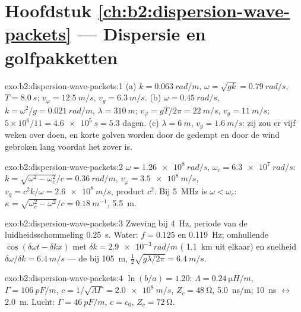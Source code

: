 \section*{Hoofdstuk \ref{ch:b2:dispersion-wave-packets} --- Dispersie en
golfpakketten}

\begin{solution}{exo:b2:dispersion-wave-packets:1}
(a) $k = \qty{0.063}{rad/m}$, $\omega = \sqrt{gk} = \qty{0.79}{rad/s}$,
$T = \qty{8.0}{s}$; $v_\varphi = \qty{12.5}{m/s}$, $v_g = \qty{6.3}{m/s}$.
(b) $\omega = \qty{0.45}{rad/s}$, $k = \omega^2
/g = \qty{0.021}{rad/m}$,
$\lambda = \qty{310}{m}$; $v_\varphi = gT/2\pi = \qty{22}{m/s}$,
$v_g =
\qty{11}{m/s}$; $5 \times 10^6/11 = \qty{4.6e5}{s} = 5.3$ dagen. (c)
$\lambda = \qty{6}{m}$, $v_g
= \qty{1.6}{m/s}$: zij zou er vijf weken over
doen, en korte golven worden door de  gedempt en door de wind
gebroken lang voordat het zover is.
\end{solution}

\begin{solution}{exo:b2:dispersion-wave-packets:2}
$\omega = \qty{1.26e8}{rad/s}$, $\omega_c = \qty{6.3e7}{rad/s}$:
$k = \sqrt{\omega^2 - \omega_c^2}/c =
\qty{0.36}{rad/m}$,
$v_\varphi = \qty{3.5e8}{m/s}$, $v_g = c^2k/\omega = \qty{2.6e8}{m/s}$,
product $c^2$. Bij \qty{5}{MHz} is $\omega < \omega_c$:
$\kappa = \sqrt{\omega_c^2 - \omega^2}/c =
\qty{0.18}{m^{-1}}$,
 \qty{5.5}{m}.
\end{solution}

\begin{solution}{exo:b2:dispersion-wave-packets:3}
Zweving bij \qty{4}{Hz}, periode van de luidheidsschommeling \qty{0.25}{s}.
Water: $f = 0.125$ en \qty{0.119}{Hz}; omhullende
$\cos(\delta\omega t - \delta kx)$ met $\delta k = \qty{2.9e-3}{rad/m}$
( \qty{1.1}{km} uit elkaar) en snelheid
$\delta\omega/\delta k = \qty{6.4}{m/s}$ --- de  bij
\qty{105}{m}, $\tfrac12\sqrt{g\lambda/2\pi} = \qty{6.4}{m/s}$.
\end{solution}

\begin{solution}{exo:b2:dispersion-wave-packets:4}
$\ln(b/a) = 1.20$: $\Lambda = \qty{0.24}{\micro H/m}$,
$\Gamma = \qty{106}{pF/m}$,
$c = 1/
\sqrt{\Lambda\Gamma} = \qty{2.0e8}{m/s}$, $Z_c = \qty{48}{\ohm}$,
\qty{5.0}{ns/m}; \qty{10}{ns} $\leftrightarrow$ \qty{2.0}{m}. Lucht:
$\Gamma = \qty{46}{pF/m}$, $c = c_0$, $Z_c = \qty{72}{\ohm}$.
\end{solution}

